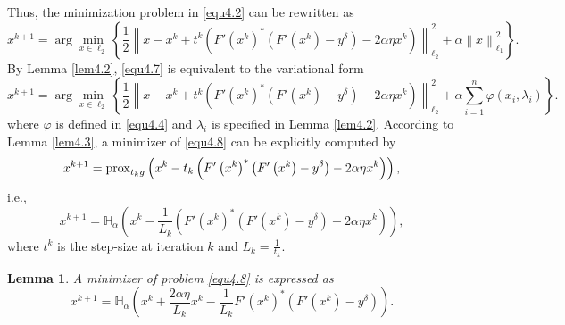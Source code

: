\documentclass[a4paper,12pt]{article}
\newtheorem{lemma}[theorem]{Lemma}
\numberwithin{equation}{section}
\begin{document}
\par Thus, the minimization problem in \eqref{equ4.2} can be rewritten as
\begin{equation}\label{equ4.7}
    x^{k+1}=\arg\min_{x\in \ell_{2}}\left\{\frac{1}{2}\left\|x-x^{k}+t^{k}\left(F'\left(x^{k}\right)^{*} \left(F'\left(x^{k}\right)-y^{\delta}\right)-2\alpha\eta x^{k}\right)\right\|_{\ell_{2}}^{2}+ \alpha\left\|x\right\|_{\ell_{1}}^{2}\right\}.
\end{equation}
By Lemma \ref{lem4.2}, \eqref{equ4.7} is equivalent to the variational form
\begin{equation}\label{equ4.8}
    x^{k+1}=\arg\min_{x\in \ell_{2}}\left\{\frac{1}{2}\left\|x-x^{k}+t^{k}\left(F'\left(x^{k}\right)^{*} \left(F'\left(x^{k}\right)-y^{\delta}\right)-2\alpha\eta x^{k}\right)\right\|_{\ell_{2}}^{2}+ \alpha\sum_{i=1}^{n}\varphi\left(x_{i},\lambda_{i}\right)\right\}.
\end{equation}
where $\varphi$ is defined in \eqref{equ4.4} and $\lambda_{i}$ is specified in Lemma \ref{lem4.2}. According to Lemma \ref{lem4.3}, a minimizer of \eqref{equ4.8} can be explicitly computed by
\begin{equation*}
    x^{k+1}={\rm prox}_{t_{k}g}\left(x^{k}-t_{k}\left(F'\left(x^{k}\right)^{*} \left(F'\left(x^{k}\right)-y^{\delta}\right)-2\alpha\eta  x^{k}\right)\right), 
\end{equation*}
i.e.,
\begin{equation*}
    x^{k+1}=\mathbb{H}_{\alpha}\left(x^{k}-\frac{1}{L_{k}} \left(F'\left(x^{k}\right)^{*} \left(F'\left(x^{k}\right)-y^{\delta}\right)-2\alpha\eta  x^{k}\right)\right), 
\end{equation*}
where $t^{k}$ is the step-size at iteration $k$ and $L_{k}=\frac{1}{t_{k}}$.

\begin{lemma}\label{lem4.5}
    A minimizer of problem \eqref{equ4.8} is expressed as
    \begin{equation}\label{equ4.9}
        x^{k+1}=\mathbb{H}_{\alpha}\left(x^{k}+\frac{2\alpha\eta}{L_{k}} x^{k}-\frac{1}{L_{k}}F'\left(x^{k}\right)^{*} \left(F'\left(x^{k}\right)-y^{\delta}\right)\right).
    \end{equation}
\end{lemma}
\end{document}
